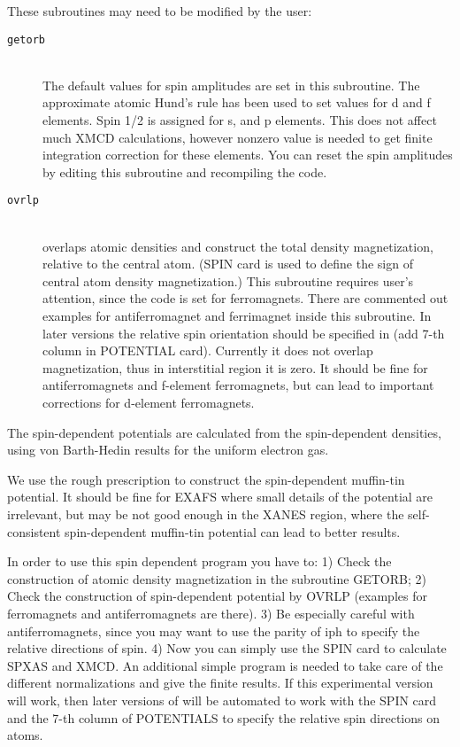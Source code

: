 \documentclass[11pt,oneside]{report} %
\begin{document}
These subroutines may need to be modified by the user:
\begin{description}
\item[\texttt{getorb}]\hfill\\ The default values for spin amplitudes
  are set in this subroutine. The approximate atomic Hund's rule has
  been used to set values for d and f elements. Spin 1/2 is assigned for
  s, and p elements. This does not affect much XMCD calculations, however
  nonzero value is needed to get finite integration correction for
  these elements. You can reset the spin amplitudes by editing this subroutine
  and recompiling the code.
\item[\texttt{ovrlp}]\hfill\\ overlaps atomic densities and construct
  the total density magnetization, relative to the central atom. 
  (SPIN card is used to define the sign of central atom density
  magnetization.) This subroutine requires user's attention, since
  the code is set for ferromagnets.
  There are commented out examples for antiferromagnet
  and ferrimagnet inside this subroutine. 
  In later versions the relative spin orientation should be specified in
   (add 7-th column in POTENTIAL card). Currently it does
  not overlap magnetization, thus in interstitial region it is zero.
  It should be fine for antiferromagnets and f-element ferromagnets,
  but can lead to important corrections for d-element ferromagnets.
\end{description}



The spin-dependent
potentials are calculated from the spin-dependent densities,
using von Barth-Hedin results for the uniform electron gas.

We use the rough prescription to construct the spin-dependent
muffin-tin potential. It should be fine for EXAFS where small details of
the potential are irrelevant, but may be not good enough in the XANES region,
where the self-consistent spin-dependent muffin-tin potential can lead to
better results.

In order to use this spin dependent program you have to: 1) Check the
construction of atomic density magnetization in the subroutine GETORB;
2) Check the construction of spin-dependent potential by OVRLP (examples
for ferromagnets and antiferromagnets are there). 
3) Be especially careful with antiferromagnets, since you may want to use
the parity of iph to specify the relative directions of spin.
4) Now you can simply use the
SPIN card to calculate SPXAS and XMCD. An additional simple program
 is needed to take care of the different normalizations
and give the finite results. If this experimental version will work,
then later versions of {\feff} will be automated to work with the SPIN
card and the 7-th column of POTENTIALS to specify the relative spin
directions on atoms.
\end{document}

